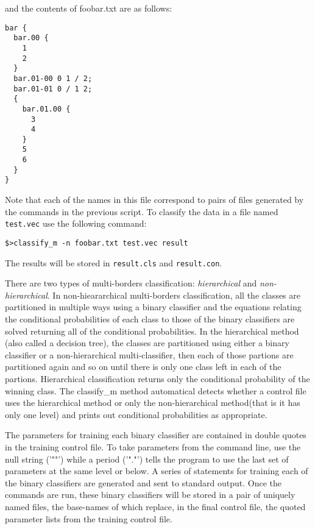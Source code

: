 \documentclass[12pt]{article}
\begin{document}
and the contents of foobar.txt are as follows:

\begin{verbatim}
bar {
  bar.00 {
    1
    2 
  }
  bar.01-00 0 1 / 2;
  bar.01-01 0 / 1 2;
  {
    bar.01.00 {
      3
      4
    }
    5
    6
  }
}
\end{verbatim}

Note that each of the names in this file correspond to pairs of files generated by the commands in the previous script. To classify the data in a file named \verb"test.vec" use the following command:

\begin{verbatim}
$>classify_m -n foobar.txt test.vec result
\end{verbatim}

The results will be stored in \verb"result.cls" and \verb"result.con".

  There are two types of multi-borders classification: {\it hierarchical} and {\it non-hierarchical}.  In non-hieararchical multi-borders classification, all the classes are partitioned in multiple ways using a binary classifier and the equations relating the conditional probabilities of each class to those of the binary classifiers are solved returning all of the conditional probabilities.  In the hierarchical method (also called a decision tree), the classes are partitioned using either a binary classifier or a non-hierarchical multi-classifier, then each of those partions are partitioned again and so on until there is only one class left in each of the partions.  Hierarchical classification returns only the conditional probability of the winning class.  The classify_m method automatical detects whether a control file uses the hierarchical method or only the non-hierarchical method(that is it has only one level) and prints out conditional probabilities as appropriate.  

  The parameters for training each binary classifier are contained in double quotes in the training control file.  To take parameters from the command line, use the null string ('""') while a period ('"."') tells the program to use the last set of parameters at the same level or below.  A series of statements for training each of the binary classifiers are generated and sent to standard output.  Once the commands are run, these binary classifiers will be stored in a pair of uniquely named files, the base-names of which replace, in the final control file, the quoted parameter lists from the training control file.
\end{document}
